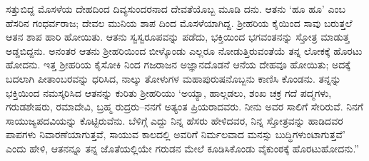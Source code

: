 ಸತ್ತುಬಿದ್ದ ಮೊಸಳೆಯ ದೇಹದಿಂದ ದಿವ್ಯಸುಂದರನಾದ ದೇವತೆಯೊಬ್ಬ ಮೂಡಿ ದನು. ಆತನು ‘ಹೂ ಹೂ’ ಎಂಬ ಹೆಸರಿನ ಗಂಧರ್ವರಾಜ; ದೇವಲ ಮುನಿಯ ಶಾಪ ದಿಂದ ಮೊಸಳೆಯಾಗಿದ್ದ. ಶ್ರೀಹರಿಯ ಕೈಯಿಂದ ಸಾವು ಬರುತ್ತಲೆ ಆತನ ಶಾಪ ಹಾರಿ ಹೋಯಿತು. ಆತನು ಸ್ವಸ್ವರೂಪವನ್ನು ಪಡೆದು, ಭಕ್ತಿಯಿಂದ ಭಗವಂತನನ್ನು ಸ್ತೋತ್ರ ಮಾಡುತ್ತ ಅಡ್ಡಬಿದ್ದನು. ಅನಂತರ ಆತನು ಶ್ರೀಹರಿಯಿಂದ ಬೀಳ್ಕೊಂಡು ಎಲ್ಲರೂ ನೋಡುತ್ತಿರುವಂತೆಯೆ ತನ್ನ ಲೋಕಕ್ಕೆ ಹೊರಟು ಹೋದನು. ಇತ್ತ ಶ್ರೀಹರಿಯ ಕೈಸೋಕಿ ನಿಂದ ಗಜರಾಜನ ಅಜ್ಞಾನದೊಡನೆ ಆನೆಯ ದೇಹವೂ ಹೋಯಿತು; ಅದಕ್ಕೆ ಬದಲಾಗಿ ಪೀತಾಂಬರವನ್ನು ಧರಿಸಿದ, ನಾಲ್ಕು ತೋಳುಗಳ ಮಹಾಪುರುಷನೊಬ್ಬನು ಕಾಣಿಸಿ ಕೊಂಡನು. ತನ್ನನ್ನು ಭಕ್ತಿಯಿಂದ ನಮಸ್ಕರಿಸಿದ ಆತನನ್ನು ಕುರಿತು ಶ್ರೀಹರಿಯು ‘ಅಯ್ಯಾ, ಹಾಲ್ಗಡಲು, ಶಂಖ ಚಕ್ರ ಗದೆ ಪದ್ಮಗಳು, ಗರುಡಶೇಷರು, ರಮಾದೇವಿ, ಬ್ರಹ್ಮ ರುದ್ರರು–ನನಗೆ ಅತ್ಯಂತ ಪ್ರಿಯರಾದವರು. ನೀನು ಅವರ ಸಾಲಿಗೆ ಸೇರಿರುವೆ. ನಿನಗೆ ಸಾಯುಜ್ಯಪದವಿಯನ್ನು ಕೊಟ್ಟಿರುವೆನು. ಬೆಳಿಗ್ಗೆ ಎದ್ದು ನಿನ್ನ ಹೆಸರು ಹೇಳಿದವರ, ನಿನ್ನ ಸ್ತೋತ್ರವನ್ನು ಹಾಡಿದವರ ಪಾಪಗಳು ನಿವಾರಣೆಯಾಗುತ್ತವೆ, ಸಾಯುವ ಕಾಲದಲ್ಲಿ ಅವರಿಗೆ ನಿರ್ಮಲವಾದ ಮನಸ್ಸು ಬುದ್ಧಿಗಳುಂಟಾಗುತ್ತವೆ’ ಎಂದು ಹೇಳಿ, ಆತನನ್ನೂ ತನ್ನ ಜೊತೆಯಲ್ಲಿಯೇ ಗರುಡನ ಮೇಲೆ ಕೂಡಿಸಿಕೊಂಡು ವೈಕುಂಠಕ್ಕೆ ಹೊರಟುಹೋದನು.”

